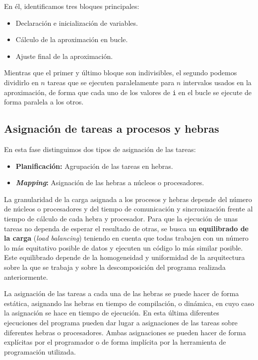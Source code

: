 En él, identificamos tres bloques principales:

\begin{itemize}
	\item Declaración e inicialización de variables.
	\item Cálculo de la aproximación en bucle.
	\item Ajuste final de la aproximación.
\end{itemize}

Mientras que el primer y último bloque son indivisibles, el segundo podemos dividirlo en $n$ tareas que se ejecuten paralelamente para $n$ intervalos usados en la aproximación, de forma que cada uno de los valores de \texttt{i} en el bucle se ejecute de forma paralela a los otros.

\subsection{Asignación de tareas a procesos y hebras}\label{asignacion-tareas-procheb}

En esta fase distinguimos dos tipos de asignación de las tareas:

\begin{itemize}
	\item\textbf{Planificación:} Agrupación de las tareas en hebras.
	\item\textbf{\textit{Mapping}:} Asignación de las hebras a núcleos o procesadores.
\end{itemize}

La granularidad de la carga asignada a los procesos y hebras depende del número de núcleos o procesadores y del tiempo de comunicación y sincronización frente al tiempo de cálculo de cada hebra y procesador.
Para que la ejecución de unas tareas no dependa de esperar el resultado de otras, se busca un \textbf{equilibrado de la carga} (\textit{load balancing}) teniendo en cuenta que todas trabajen con un número lo más equitativo posible de datos y ejecuten un código lo más similar posible.
Este equilibrado depende de la homogeneidad y uniformidad de la arquitectura sobre la que se trabaja y sobre la descomposición del programa realizada anteriormente.

La asignación de las tareas a cada una de las hebras se puede hacer de forma estática, asignando las hebras en tiempo de compilación, o dinámica, en cuyo caso la asignación se hace en tiempo de ejecución.
En esta última diferentes ejecuciones del programa pueden dar lugar a asignaciones de las tareas sobre diferentes hebras o procesadores.
Ambas asignaciones se pueden hacer de forma explícitas por el programador o de forma implícita por la herramienta de programación utilizada.

